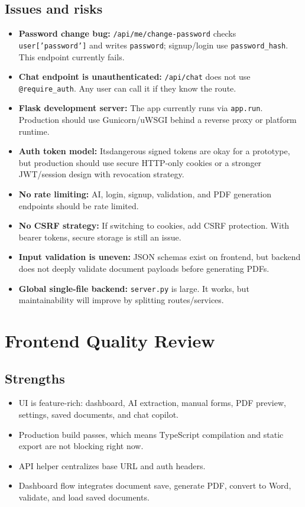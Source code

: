 \documentclass[11pt]{article}
\begin{document}
\subsection{Issues and risks}
\begin{itemize}
  \item \textbf{Password change bug:} \texttt{/api/me/change-password} checks \texttt{user['password']} and writes \texttt{password}; signup/login use \texttt{password\_hash}. This endpoint currently fails.
  \item \textbf{Chat endpoint is unauthenticated:} \texttt{/api/chat} does not use \texttt{@require\_auth}. Any user can call it if they know the route.
  \item \textbf{Flask development server:} The app currently runs via \texttt{app.run}. Production should use Gunicorn/uWSGI behind a reverse proxy or platform runtime.
  \item \textbf{Auth token model:} Itsdangerous signed tokens are okay for a prototype, but production should use secure HTTP-only cookies or a stronger JWT/session design with revocation strategy.
  \item \textbf{No rate limiting:} AI, login, signup, validation, and PDF generation endpoints should be rate limited.
  \item \textbf{No CSRF strategy:} If switching to cookies, add CSRF protection. With bearer tokens, secure storage is still an issue.
  \item \textbf{Input validation is uneven:} JSON schemas exist on frontend, but backend does not deeply validate document payloads before generating PDFs.
  \item \textbf{Global single-file backend:} \texttt{server.py} is large. It works, but maintainability will improve by splitting routes/services.
\end{itemize}

\section{Frontend Quality Review}

\subsection{Strengths}
\begin{itemize}
  \item UI is feature-rich: dashboard, AI extraction, manual forms, PDF preview, settings, saved documents, and chat copilot.
  \item Production build passes, which means TypeScript compilation and static export are not blocking right now.
  \item API helper centralizes base URL and auth headers.
  \item Dashboard flow integrates document save, generate PDF, convert to Word, validate, and load saved documents.
\end{itemize}
\end{document}
